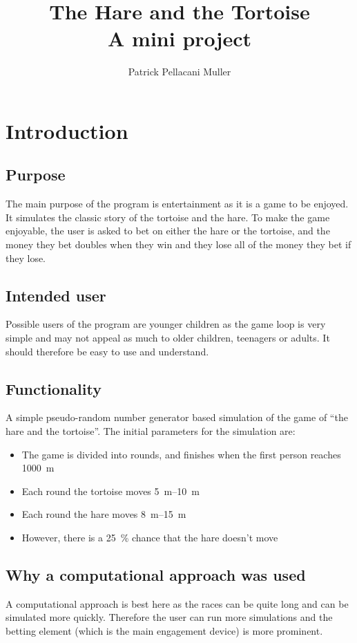 \documentclass[11pt]{article}
\title{%
    The Hare and the Tortoise \\
    \large A mini project \\
}
\author{Patrick Pellacani Muller}
\date{\displaydate{writing_date}}
\begin{document}
\maketitle
\section{Introduction}
\subsection{Purpose}
The main purpose of the program is entertainment as it is a game to be enjoyed. It
simulates the classic story of the tortoise and the hare. To make the game enjoyable,
the user is asked to bet on either the hare or the tortoise, and the money they bet
doubles when they win and they lose all of the money they bet if they lose.
\subsection{Intended user}
Possible users of the program are younger children as the game loop is very simple and
may not appeal as much to older children, teenagers or adults. It should therefore be easy
to use and understand.
\subsection{Functionality}
A simple pseudo-random number generator based simulation of the game of ``the hare and the
tortoise''. The initial parameters for the simulation are:
\begin{itemize}
	\item The game is divided into rounds, and finishes when the first person reaches
	      \qty{1000}{\metre}
	\item Each round the tortoise moves \qtyrange{5}{10}{\metre}
	\item Each round the hare moves \qtyrange{8}{15}{\metre}
	\item However, there is a \qty{25}{\percent} chance that the hare doesn't move
\end{itemize}

\subsection{Why a computational approach was used}
\label{sec:approach}
A computational approach is best here as the races can be quite long and can be simulated more
quickly. Therefore the user can run more simulations and the betting element (which is
the main engagement device) is more prominent.
\end{document}
